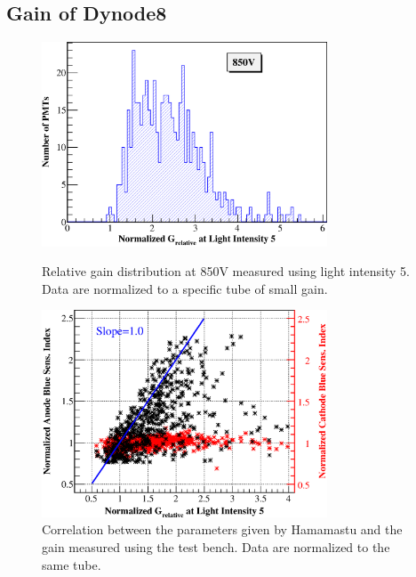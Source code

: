 \documentclass[5p, times]{elsarticle}
\begin{document}
\subsection{Gain of Dynode8}
\label{sec:psd_gain}

\begin{figure}[h!]
 \centering
 \includegraphics[width=85mm]{GainDist}
\caption{Relative gain distribution at 850V measured using light intensity 5.
Data are normalized to a specific tube of small gain.}
\label{fig:gain_dist}
\vspace*{0.1in}
 \centering
 \includegraphics[width=85mm]{correlation_new}
\caption{Correlation between the parameters given by Hamamastu and the gain measured using the test bench.
Data are normalized to the same tube.}
\label{fig:gain_correlation}
\end{figure} 
\end{document}
